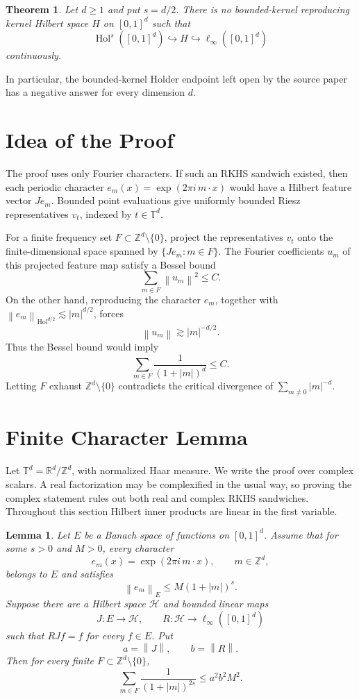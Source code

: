 \documentclass[11pt]{article}
\newtheorem{theorem}{Theorem}
\newtheorem{lemma}{Lemma}
\newcommand{\T}{\mathbb{T}}
\newcommand{\R}{\mathbb{R}}
\newcommand{\Z}{\mathbb{Z}}
\newcommand{\Hol}{\operatorname{Hol}}
\newcommand{\linf}{\ell_\infty}
\newcommand{\norm}[1]{\left\lVert #1\right\rVert}
\newcommand{\abs}[1]{\left\lvert #1\right\rvert}
\begin{document}
\begin{theorem}\label{thm:all-d}
Let \(d\ge1\) and put \(s=d/2\). There is no bounded-kernel reproducing kernel
Hilbert space \(H\) on \([0,1]^d\) such that
\[
  \Hol^s([0,1]^d)\hookrightarrow H\hookrightarrow \linf([0,1]^d)
\]
continuously.
\end{theorem}

In particular, the bounded-kernel Holder endpoint left open by the source
paper has a negative answer for every dimension \(d\).

\section*{Idea of the Proof}

The proof uses only Fourier characters. If such an RKHS sandwich existed, then
each periodic character \(e_m(x)=\exp(2\pi i\,m\cdot x)\) would have a Hilbert
feature vector \(J e_m\). Bounded point evaluations give uniformly bounded
Riesz representatives \(v_t\), indexed by \(t\in\T^d\).

For a finite frequency set \(F\subset\Z^d\setminus\{0\}\), project the
representatives \(v_t\) onto the finite-dimensional space spanned by
\(\{J e_m:m\in F\}\). The Fourier coefficients \(u_m\) of this projected
feature map satisfy a Bessel bound
\[
  \sum_{m\in F}\norm{u_m}^2\le C .
\]
On the other hand, reproducing the character \(e_m\), together with
\(\norm{e_m}_{\Hol^{d/2}}\lesssim |m|^{d/2}\), forces
\[
  \norm{u_m}\gtrsim |m|^{-d/2}.
\]
Thus the Bessel bound would imply
\[
  \sum_{m\in F}\frac{1}{(1+|m|)^d}\le C .
\]
Letting \(F\) exhaust \(\Z^d\setminus\{0\}\) contradicts the critical
divergence of \(\sum_{m\ne0}|m|^{-d}\).

\section*{Finite Character Lemma}

Let \(\T^d=\R^d/\Z^d\), with normalized Haar measure. We write the proof over
complex scalars. A real factorization may be complexified in the usual way, so
proving the complex statement rules out both real and complex RKHS sandwiches.
Throughout this section Hilbert inner products are linear in the first
variable.

\begin{lemma}\label{lem:characters}
Let \(E\) be a Banach space of functions on \([0,1]^d\). Assume that for some
\(s>0\) and \(M>0\), every character
\[
  e_m(x)=\exp(2\pi i\,m\cdot x),\qquad m\in\Z^d,
\]
belongs to \(E\) and satisfies
\[
  \norm{e_m}_E\le M(1+\abs m)^s .
\]
Suppose there are a Hilbert space \(\mathcal H\) and bounded linear maps
\[
  J:E\to\mathcal H,\qquad R:\mathcal H\to\linf([0,1]^d)
\]
such that \(RJf=f\) for every \(f\in E\). Put
\[
  a=\norm J,\qquad b=\norm R .
\]
Then for every finite \(F\subset\Z^d\setminus\{0\}\),
\[
  \sum_{m\in F}\frac{1}{(1+\abs m)^{2s}}\le a^2b^2M^2 .
\]
\end{lemma}
\end{document}
